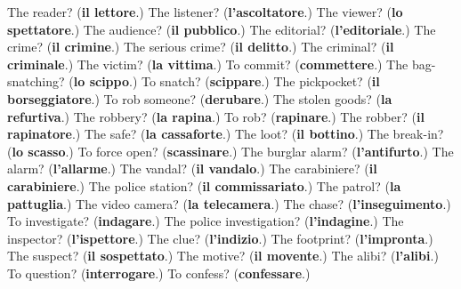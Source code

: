 \begin{tcolorbox}[breakable,colback=teal!4,colframe=teal!35!black,title={Before you move on}]
The reader? (\textbf{il lettore}.) The listener? (\textbf{l'ascoltatore}.) The viewer? (\textbf{lo spettatore}.) The audience? (\textbf{il pubblico}.) The editorial? (\textbf{l'editoriale}.) The crime? (\textbf{il crimine}.) The serious crime? (\textbf{il delitto}.) The criminal? (\textbf{il criminale}.) The victim? (\textbf{la vittima}.) To commit? (\textbf{commettere}.) The bag-snatching? (\textbf{lo scippo}.) To snatch? (\textbf{scippare}.) The pickpocket? (\textbf{il borseggiatore}.) To rob someone? (\textbf{derubare}.) The stolen goods? (\textbf{la refurtiva}.) The robbery? (\textbf{la rapina}.) To rob? (\textbf{rapinare}.) The robber? (\textbf{il rapinatore}.) The safe? (\textbf{la cassaforte}.) The loot? (\textbf{il bottino}.) The break-in? (\textbf{lo scasso}.) To force open? (\textbf{scassinare}.) The burglar alarm? (\textbf{l'antifurto}.) The alarm? (\textbf{l'allarme}.) The vandal? (\textbf{il vandalo}.) The carabiniere? (\textbf{il carabiniere}.) The police station? (\textbf{il commissariato}.) The patrol? (\textbf{la pattuglia}.) The video camera? (\textbf{la telecamera}.) The chase? (\textbf{l'inseguimento}.) To investigate? (\textbf{indagare}.) The police investigation? (\textbf{l'indagine}.) The inspector? (\textbf{l'ispettore}.) The clue? (\textbf{l'indizio}.) The footprint? (\textbf{l'impronta}.) The suspect? (\textbf{il sospettato}.) The motive? (\textbf{il movente}.) The alibi? (\textbf{l'alibi}.) To question? (\textbf{interrogare}.) To confess? (\textbf{confessare}.)
\end{tcolorbox}
